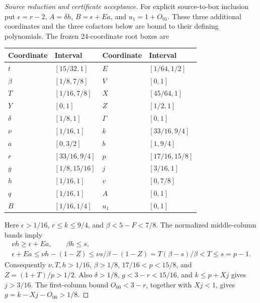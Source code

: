 \documentclass[11pt,reqno]{amsart}
\theoremstyle{definition}
\theoremstyle{remark}
\begin{document}
\begin{proof}[Source reduction and certificate acceptance]
For explicit source-to-box inclusion put
\(\epsilon=r-2\), \(A=\delta h\), \(B=\epsilon+Ea\), and
\(u_1=1+O_{01}\). These three additional coordinates and the three
cofactors below are bound to their defining polynomials. The frozen
24-coordinate root boxes are
\begin{center}\small
\begin{tabular}{@{}llll@{}}
\toprule
Coordinate&Interval&Coordinate&Interval\\
\midrule
\(t\)&\([15/32,1]\)&\(E\)&\([1/64,1/2]\)\\
\(\beta\)&\([1/8,7/8]\)&\(V\)&\([0,1]\)\\
\(T\)&\([1/16,7/8]\)&\(X\)&\([45/64,1]\)\\
\(Y\)&\([0,1]\)&\(Z\)&\([1/2,1]\)\\
\(\delta\)&\([1/8,1]\)&\(\Gamma\)&\([0,1]\)\\
\(\nu\)&\([1/16,1]\)&\(k\)&\([33/16,9/4]\)\\
\(a\)&\([0,3/2]\)&\(b\)&\([1,9/4]\)\\
\(r\)&\([33/16,9/4]\)&\(p\)&\([17/16,15/8]\)\\
\(g\)&\([1/8,15/16]\)&\(j\)&\([3/16,1]\)\\
\(h\)&\([1/16,1]\)&\(v\)&\([0,7/8]\)\\
\(q\)&\([1/16,1]\)&\(A\)&\([0,1]\)\\
\(B\)&\([1/16,1/4]\)&\(u_1\)&\([0,1]\)\\
\bottomrule
\end{tabular}
\end{center}
Here \(\epsilon>1/16\), \(r\le k\le9/4\), and
\(\beta<5-F<7/8\). The normalized middle-column bands imply
\[
\begin{gathered}
 \nu h\ge\epsilon+Ea,\qquad \beta h\le s,\\
 \epsilon+Ea\le\nu h-(1-Z)\le\nu s/\beta-(1-Z)
 =T(\beta-s)/\beta<T\le s=p-1.
\end{gathered}
\]
Consequently \(\nu,T,h>1/16\), \(\beta>1/8\),
\(17/16<p<15/8\), and \(Z=(1+T)/p>1/2\).
Also \(\delta>1/8\), \(g<3-r<15/16\), and
\(k\le p+Xj\) gives \(j>3/16\). The first-column bound
\(O_{00}<3-r\), together with \(Xj<1\), gives
\(g=k-Xj-O_{00}>1/8\).


\end{proof}
\end{document}
